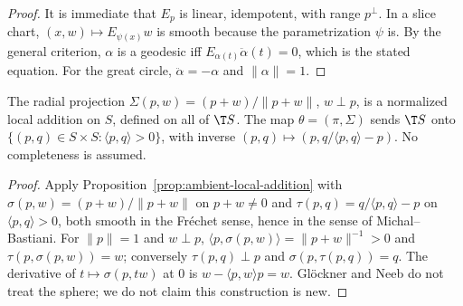 \begin{proof}
  \leanok
  It is immediate that $E_p$ is linear, idempotent, with range $p^\perp$. In a slice chart,
  $(x, w) \mapsto E_{\psi(x)} w$ is smooth because the parametrization $\psi$ is. By the general
  criterion, $\alpha$ is a geodesic iff $E_{\alpha(t)}\ddot\alpha(t) = 0$, which is the stated
  equation. For the great circle, $\ddot\alpha = -\alpha$ and $\|\alpha\| = 1$.
\end{proof}

\begin{theorem}
  \label{thm:ex-sphere-local-addition}
  \leanok
  The radial projection $\Sigma(p, w) = (p + w)/\|p + w\|$, $w \perp p$, is a normalized local
  addition on $S$, defined on all of $\T S$. The map $\theta = (\pi, \Sigma)$ sends $\T S$ onto
  $\{(p, q) \in S \times S : \langle p, q\rangle > 0\}$, with inverse
  $(p, q) \mapsto (p, q/\langle p, q\rangle - p)$. No completeness is assumed.
\end{theorem}

\begin{proof}
  \leanok
  Apply Proposition~\ref{prop:ambient-local-addition} with $\sigma(p, w) = (p + w)/\|p + w\|$ on
  $p + w \neq 0$ and $\tau(p, q) = q/\langle p, q\rangle - p$ on $\langle p, q\rangle > 0$, both
  smooth in the Fréchet sense, hence in the sense of Michal--Bastiani. For $\|p\| = 1$ and
  $w \perp p$, $\langle p, \sigma(p, w)\rangle = \|p + w\|^{-1} > 0$ and
  $\tau(p, \sigma(p, w)) = w$; conversely $\tau(p, q) \perp p$ and $\sigma(p, \tau(p, q)) = q$. The
  derivative of $t \mapsto \sigma(p, tw)$ at $0$ is $w - \langle p, w\rangle p = w$. Glöckner and
  Neeb do not treat the sphere; we do not claim this construction is new.
\end{proof}

